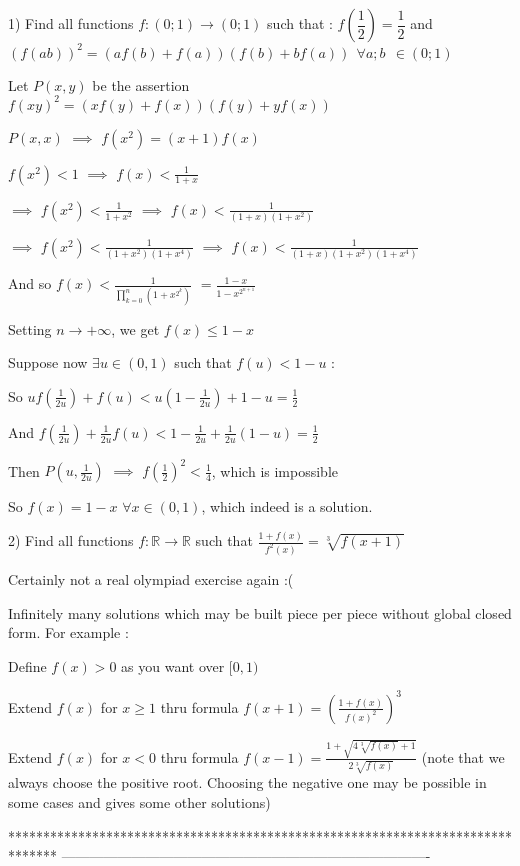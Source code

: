 \begin{solution}
	\begin{tcolorbox}1) Find all functions $ f : ( 0 ; 1) \to ( 0 ; 1) $ such that : $ f \left( \dfrac{1}{2} \right) = \dfrac{1}{2}$  and $ (f(ab))^2 = ( af(b) + f(a)) ( f(b) + bf(a)) \ \ \forall a ; b \ \ \in ( 0 ; 1) $\end{tcolorbox}
Let $P(x,y)$ be the assertion $f(xy)^2=(xf(y)+f(x))(f(y)+yf(x))$

$P(x,x)$ $\implies$ $f(x^2)=(x+1)f(x)$

$f(x^2)<1$ $\implies$ $f(x)<\frac 1{1+x}$

$\implies$ $f(x^2)<\frac 1{1+x^2}$ $\implies$ $f(x)<\frac 1{(1+x)(1+x^2)}$

$\implies$ $f(x^2)<\frac 1{(1+x^2)(1+x^4)}$ $\implies$ $f(x)<\frac 1{(1+x)(1+x^2)(1+x^4)}$

And so $f(x)<\frac 1{\prod_{k=0}^n(1+x^{2^k})}$ $=\frac{1-x}{1-x^{2^{n+1}}}$

Setting $n\to +\infty$, we get $f(x)\le 1-x$

Suppose now $\exists u\in(0,1)$ such that $f(u)<1-u$ :

So $uf(\frac 1{2u})+f(u)<u(1-\frac 1{2u})+1-u=\frac 12$

And $f(\frac 1{2u})+\frac 1{2u}f(u)<1-\frac 1{2u}+\frac 1{2u}(1-u)=\frac 12$

Then $P(u,\frac 1{2u})$ $\implies$ $f(\frac 12)^2<\frac 14$, which is impossible

So $\boxed{f(x)=1-x}$ $\forall x\in(0,1)$, which indeed is a solution.
\end{solution}



\begin{solution}
	\begin{tcolorbox}2) Find all functions $f:\mathbb{R}\to \mathbb{R}$ such that $\frac{1+f(x)}{f^{2}(x)}=\sqrt[3]{f(x+1)}$\end{tcolorbox}
Certainly not a real olympiad exercise again :(

Infinitely many solutions which may be built piece per piece without global closed form. For example :

Define $f(x)>0$ as you want over $[0,1)$

Extend $f(x)$ for $x\ge 1$ thru formula $f(x+1)= \left(\frac{1+f(x)}{f(x)^2}\right)^3$

Extend $f(x)$ for $x<0$ thru formula $f(x-1)=\frac{1+\sqrt{4\sqrt[3]{f(x)}+1}}{2\sqrt[3]{f(x)}}$ (note that we always choose the positive root. Choosing the negative one may be possible in some cases and gives some other solutions)
\end{solution}
*******************************************************************************
-------------------------------------------------------------------------------

